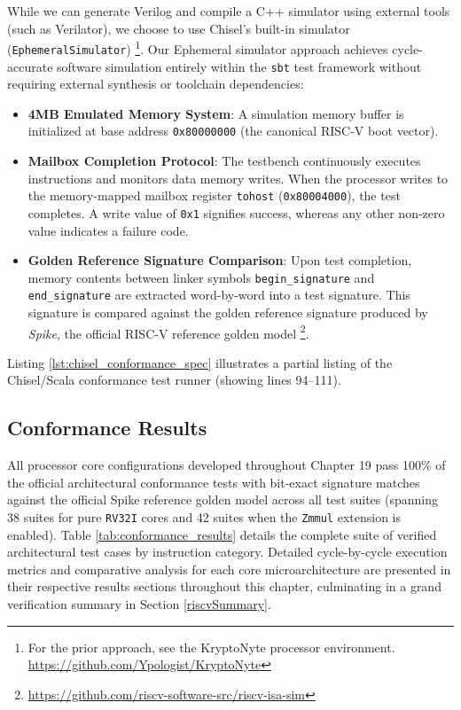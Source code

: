 While we can generate Verilog and compile a C++ simulator using external tools (such as Verilator), we choose to use Chisel's built-in simulator (\texttt{EphemeralSimulator}) 
\footnote{For the prior approach, see the KryptoNyte processor environment. \url{https://github.com/Ypologist/KryptoNyte}}.
Our Ephemeral simulator approach achieves cycle-accurate software simulation entirely within the \texttt{sbt} test framework without requiring external synthesis or toolchain dependencies:
\begin{itemize}
    \item \textbf{4MB Emulated Memory System}: A simulation memory buffer is initialized at base address \texttt{0x80000000} (the canonical RISC-V boot vector).
    \item \textbf{Mailbox Completion Protocol}: The testbench continuously executes instructions and monitors data memory writes. When the processor writes to the memory-mapped mailbox register \texttt{tohost} (\texttt{0x80004000}), the test completes. A write value of \texttt{0x1} signifies success, whereas any other non-zero value indicates a failure code.
    \item \textbf{Golden Reference Signature Comparison}: Upon test completion, memory contents between linker symbols \texttt{begin\_signature} and \texttt{end\_signature} are extracted word-by-word into a test signature. This signature is compared against the golden reference signature produced by \textit{Spike}, the official RISC-V reference golden model \cite{riscv-spike}\footnote{\url{https://github.com/riscv-software-src/riscv-isa-sim}}.
\end{itemize}

Listing \ref{lst:chisel_conformance_spec} illustrates a partial listing of the Chisel/Scala conformance test runner (showing lines 94--111).


\subsection{Conformance Results}

All processor core configurations developed throughout Chapter 19 pass 100\% of the official architectural conformance tests with bit-exact signature matches against the official Spike reference golden model \cite{riscv-spike} across all test suites (spanning 38 suites for pure \texttt{RV32I} cores and 42 suites when the \texttt{Zmmul} extension is enabled). Table \ref{tab:conformance_results} details the complete suite of verified architectural test cases by instruction category. Detailed cycle-by-cycle execution metrics and comparative analysis for each core microarchitecture are presented in their respective results sections throughout this chapter, culminating in a grand verification summary in Section \ref{riscvSummary}.

